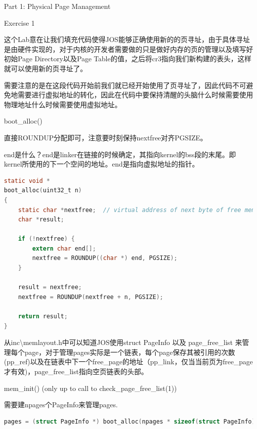 \documentclass[GBK,winfonts,a4paper,10pt]{ctexart}
\begin{document}
\begin{section}{Part 1: Physical Page Management}

\begin{subsection}{Exercise 1}
\par
这个Lab意在让我们填充代码使得JOS能够正确使用新的的页寻址，由于具体寻址是由硬件实现的，对于内核的开发者需要做的只是做好内存的页的管理以及填写好初始Page Directory以及Page Table的值，之后将cr3指向我们新构建的表头，这样就可以使用新的页寻址了。
\par
需要注意的是在这段代码开始前我们就已经开始使用了页寻址了，因此代码不可避免地需要进行虚拟地址的转化，因此在代码中要保持清醒的头脑什么时候需要使用物理地址什么时候需要使用虚拟地址。
\begin{subsubsection}{boot\_alloc()}
\par 
直接ROUNDUP分配即可，注意要时刻保持nextfree对齐PGSIZE。
\par
end是什么？end是linker在链接的时候确定，其指向kernel的bss段的末尾。即kernel所使用的下一个空间的地址。end是指向虚拟地址的指针。
\begin{lstlisting}[language=C]
static void *
boot_alloc(uint32_t n)
{
	static char *nextfree;	// virtual address of next byte of free memory
	char *result;
	
	if (!nextfree) {
		extern char end[];
		nextfree = ROUNDUP((char *) end, PGSIZE);
	}
	
    result = nextfree;
    nextfree = ROUNDUP(nextfree + n, PGSIZE);

	return result;
}
\end{lstlisting}
\end{subsubsection}

从inc\textbackslash memlayout.h中可以知道JOS使用struct PageInfo 以及 page\_free\_list 来管理每个page，对于管理pages实际是一个链表，每个page保存其被引用的次数(pp\_ref)以及在链表中下一个free\_page的地址（pp\_link，仅当当前页为free\_page才有效)，page\_free\_list指向空页链表的头部。

\begin{subsubsection}{mem\_init() (only up to call to check\_page\_free\_list(1))}
\par
需要建npages个PageInfo来管理pages.
\begin{lstlisting}[language=C]
pages = (struct PageInfo *) boot_alloc(npages * sizeof(struct PageInfo));
\end{lstlisting}

\end{subsubsection}


\end{subsection}
\end{section}
\end{document}
